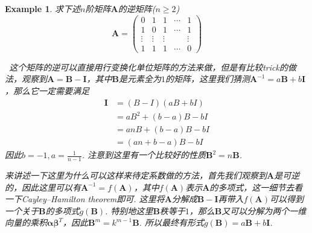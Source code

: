 \documentclass{article}
\newtheorem{example}[theorem]{Example}
\newcommand{\hints}{{\color{blue} \text{hints}}}
\newcommand{\mbf}[1]{\bm{#1}}
\begin{document}
\begin{example}
\rm 求下述$n$阶矩阵$\mbf{A}$的逆矩阵($n \geq 2$)
$$
\mbf{A} =
\begin{pmatrix}
0 & 1 & 1 & \cdots & 1 \\
1 & 0 & 1 & \cdots & 1 \\
\vdots & \vdots & \vdots &  & \vdots \\
1 & 1 & 1 & \cdots & 0
\end{pmatrix}
$$

\hints\ 这个矩阵的逆可以直接用行变换化单位矩阵的方法来做，但是有比较trick的做法，观察到$\mbf{A} = \mbf{B}-\mbf{I}$，其中$\mbf{B}$是元素全为$1$的矩阵，这里我们猜测$\mbf{A}^{-1} = a\mbf{B} + b\mbf{I}$，那么它一定需要满足
$$
\begin{array}{ll}
\mbf{I}  &= (B-I)(aB + bI) \\
  &= aB^2+(b-a)B -bI \\
  &= anB + (b-a)B - bI \\
  &= (an+b-a)B - bI
\end{array}
$$
因此$b=-1,a = \frac{1}{n-1}$. 注意到这里有一个比较好的性质$\mbf{B}^2 = n\mbf{B}$.

来讲述一下这里为什么可以这样来待定系数做的方法，首先我们观察到$\mbf{A}$是可逆的，因此这里可以有$\mbf{A}^{-1} = f(\mbf{A})$，其中$f(\mbf{A})$表示$\mbf{A}$的多项式，这一细节去看一下Cayley–Hamilton theorem即可. 这里将$\mbf{A}$分解成$\mbf{B} - \mbf{I}$再带入$f(\mbf{A})$可以得到一个关于$\mbf{B}$的多项式$g(\mbf{B})$. 特别地这里$\mbf{B}$秩等于$1$，那么$\mbf{B}$又可以分解为两个一维向量的乘积$\mbf{\alpha} \mbf{\beta}^T$，因此$\mbf{B}^m = k^{m-1}\mbf{B}$. 所以最终有形式$g(\mbf{B}) = a\mbf{B} + b\mbf{I}$. 
\end{example}
\end{document}
